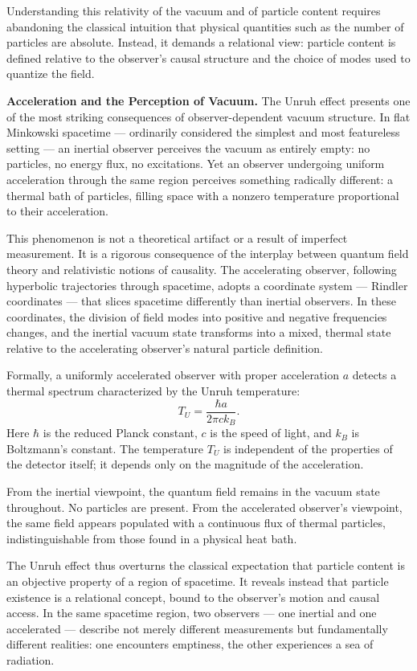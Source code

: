 Understanding this relativity of the vacuum and of particle content requires abandoning the classical intuition that physical quantities such as the number of particles are absolute. Instead, it demands a relational view: particle content is defined relative to the observer's causal structure and the choice of modes used to quantize the field.

\textbf{Acceleration and the Perception of Vacuum.} The Unruh effect presents one of the most striking consequences of observer-dependent vacuum structure. In flat Minkowski spacetime — ordinarily considered the simplest and most featureless setting — an inertial observer perceives the vacuum as entirely empty: no particles, no energy flux, no excitations. Yet an observer undergoing uniform acceleration through the same region perceives something radically different: a thermal bath of particles, filling space with a nonzero temperature proportional to their acceleration.

This phenomenon is not a theoretical artifact or a result of imperfect measurement. It is a rigorous consequence of the interplay between quantum field theory and relativistic notions of causality. The accelerating observer, following hyperbolic trajectories through spacetime, adopts a coordinate system — Rindler coordinates — that slices spacetime differently than inertial observers. In these coordinates, the division of field modes into positive and negative frequencies changes, and the inertial vacuum state transforms into a mixed, thermal state relative to the accelerating observer's natural particle definition.

Formally, a uniformly accelerated observer with proper acceleration $a$ detects a thermal spectrum characterized by the Unruh temperature:
\[
T_U = \frac{\hbar a}{2\pi c k_B}.
\]
Here $\hbar$ is the reduced Planck constant, $c$ is the speed of light, and $k_B$ is Boltzmann's constant. The temperature $T_U$ is independent of the properties of the detector itself; it depends only on the magnitude of the acceleration. 

From the inertial viewpoint, the quantum field remains in the vacuum state throughout. No particles are present. From the accelerated observer’s viewpoint, the same field appears populated with a continuous flux of thermal particles, indistinguishable from those found in a physical heat bath. 

The Unruh effect thus overturns the classical expectation that particle content is an objective property of a region of spacetime. It reveals instead that particle existence is a relational concept, bound to the observer’s motion and causal access. In the same spacetime region, two observers — one inertial and one accelerated — describe not merely different measurements but fundamentally different realities: one encounters emptiness, the other experiences a sea of radiation.

